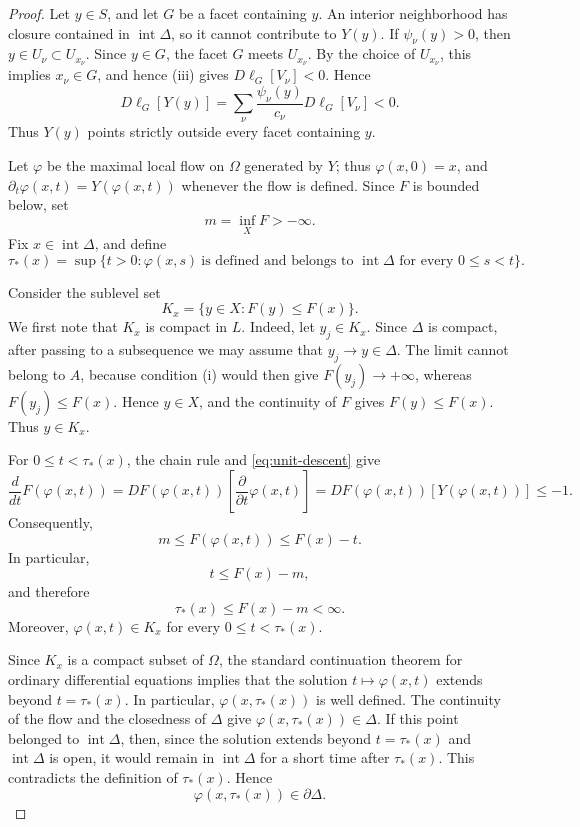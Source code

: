 \documentclass[12pt,reqno]{amsart}
\numberwithin{equation}{section}
\theoremstyle{remark}
\begin{document}
\begin{proof}
	
	Let \(y\in S\), and let \(G\) be a facet containing \(y\).
	An interior neighborhood has closure contained in
	\(\operatorname{int}\Delta\), so it cannot contribute to \(Y(y)\).
If \(\psi_\nu(y)>0\), then
\(y\in U_\nu\subset U_{x_\nu}\). Since \(y\in G\), the facet \(G\)
meets \(U_{x_\nu}\). By the choice of \(U_{x_\nu}\), this implies
\(x_\nu\in G\), and hence \textup{(iii)} gives
\(D\ell_G[V_\nu]<0\). Hence
	\begin{equation}\label{DLG}
	D\ell_G[Y(y)]
	=
	\sum_\nu
	\frac{\psi_\nu(y)}{c_\nu}
	D\ell_G[V_\nu]
	<0.
	\end{equation}
	Thus \(Y(y)\) points strictly outside every facet containing \(y\).
	
	Let \(\varphi\) be the maximal local flow on \(\Omega\) generated by
	\(Y\); thus \(\varphi(x,0)=x\), and
	\(\partial_t\varphi(x,t)=Y(\varphi(x,t))\) whenever the flow is
	defined. Since \(F\) is bounded below, set
	\[
	m=\inf_X F>-\infty.
	\]
	Fix \(x\in\operatorname{int}\Delta\), and define
	\[
	\tau_*(x)
	=
	\sup\bigl\{
	t>0:
	\varphi(x,s)\ \text{is defined and belongs to }
	\operatorname{int}\Delta
	\text{ for every }0\leq s<t
	\bigr\}.
	\]
	
	Consider the sublevel set
	\[
	K_x=\{y\in X:F(y)\leq F(x)\}.
	\]
	We first note that \(K_x\) is compact in \(L\). Indeed, let
	\(y_j\in K_x\). Since \(\Delta\) is compact, after passing to a
	subsequence we may assume that \(y_j\to y\in\Delta\). The limit
	cannot belong to \(A\), because condition \textup{(i)} would then
	give \(F(y_j)\to+\infty\), whereas \(F(y_j)\leq F(x)\). Hence
	\(y\in X\), and the continuity of \(F\) gives
	\(F(y)\leq F(x)\). Thus \(y\in K_x\).
	
	For \(0\leq t<\tau_*(x)\), the chain rule and
	\eqref{eq:unit-descent} give
	\[
	\frac{d}{dt}F(\varphi(x,t))
	=
	DF(\varphi(x,t))
	\left[
	\frac{\partial}{\partial t}\varphi(x,t)
	\right]=
	DF(\varphi(x,t))[Y(\varphi(x,t))]
	\leq-1.
	\]
	Consequently,
	\[
m\le	F(\varphi(x,t))\leq F(x)-t.
	\]
	In particular,
	\[
	t\leq F(x)-m,
	\]
	and therefore
	\[
	\tau_*(x)\leq F(x)-m<\infty.
	\]
	Moreover, \(\varphi(x,t)\in K_x\) for every
	\(0\leq t<\tau_*(x)\).
	
	Since 
	\(K_x\) is a compact subset of \(\Omega\), the standard continuation
	theorem for ordinary differential equations implies that the solution
	\(t\mapsto\varphi(x,t)\) extends beyond \(t=\tau_*(x)\). In particular,
	\(\varphi(x,\tau_*(x))\) is well defined.  The continuity of the flow and the closedness
	of \(\Delta\) give
	\(\varphi(x,\tau_*(x))\in\Delta\).
	If this point belonged to \(\operatorname{int}\Delta\), then, since
	the solution extends beyond \(t=\tau_*(x)\) and
	\(\operatorname{int}\Delta\) is open, it would remain in
	\(\operatorname{int}\Delta\) for a short time after \(\tau_*(x)\).
	This contradicts the definition of \(\tau_*(x)\). Hence
	\[
	\varphi(x,\tau_*(x))\in\partial\Delta.
	\]
	

\end{proof}
\end{document}
